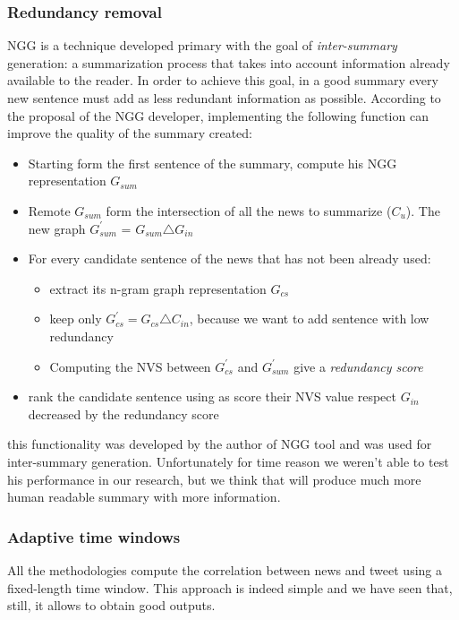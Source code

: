 \subsubsection*{Redundancy removal}
NGG is a technique developed primary with the goal of \emph{inter-summary} generation: a summarization process that takes into account information already available to the reader. In order to achieve this goal, in a good summary every new sentence must add as less redundant information as possible.
According to the proposal of the NGG developer, implementing the following function can improve the quality of the summary created:
\begin{itemize}
	\item Starting form the first sentence of the summary, compute his NGG representation $G_{sum}$
	\item Remote $G_{sum}$ form the intersection of all the news to summarize ($C_{u}$). The new graph $G_{sum}^{\prime}$ = $G_{sum} \triangle G_{in}$
	\item For every candidate sentence of the news that has not been already used:
	\begin{itemize}
		\item extract its n-gram graph representation $G_{cs}$
		\item keep only $G_{cs}^{\prime} = G_{cs} \triangle C_{in}$, because we want to add sentence with low redundancy
		\item Computing the NVS between $G_{cs}^{\prime}$ and $G_{sum}^{\prime}$ give a \emph{redundancy score}
	\end{itemize}
	\item rank the candidate sentence using as score their NVS value respect $G_{in}$ decreased by the redundancy score
\end{itemize}
this functionality was developed by the author of NGG tool and was used for inter-summary generation. Unfortunately for time reason we weren't able to test his performance in our research, but we think that will produce much more human readable summary with more information.

\subsubsection*{Adaptive time windows}
All the methodologies compute the correlation between news and tweet using a
fixed-length time window. This approach is indeed simple and we have seen that,
still, it allows to obtain good outputs. 

